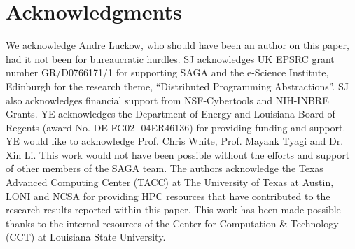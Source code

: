 \documentclass[conference,final]{IEEEtran}
\begin{document}






\section{Acknowledgments}
We acknowledge Andre Luckow, who should have been an author on this
paper, had it not been for bureaucratic hurdles.  SJ acknowledges UK
EPSRC grant number GR/D0766171/1 for supporting SAGA and the e-Science
Institute, Edinburgh for the research theme, ``Distributed Programming
Abstractions''.  SJ also acknowledges financial support from
NSF-Cybertools and NIH-INBRE Grants. YE acknowledges the Department of
Energy and Louisiana Board of Regents (award No. DE-FG02- 04ER46136)
for providing funding and support. YE would like to acknowledge
Prof. Chris White, Prof. Mayank Tyagi and Dr. Xin Li. This work would
not have been possible without the efforts and support of other
members of the SAGA team. The authors acknowledge the Texas Advanced
Computing Center (TACC) at The University of Texas at Austin, LONI and
NCSA for providing HPC resources that have contributed to the research
results reported within this paper. This work has been made possible
thanks to the internal resources of the Center for Computation \&
Technology (CCT) at Louisiana State University.

 

\end{document}

